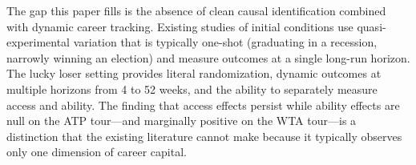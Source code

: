 The gap this paper fills is the absence of clean causal identification combined with dynamic career tracking. Existing studies of initial conditions use quasi-experimental variation that is typically one-shot (graduating in a recession, narrowly winning an election) and measure outcomes at a single long-run horizon. The lucky loser setting provides literal randomization, dynamic outcomes at multiple horizons from 4 to 52 weeks, and the ability to separately measure access and ability. The finding that access effects persist while ability effects are null on the ATP tour---and marginally positive on the WTA tour---is a distinction that the existing literature cannot make because it typically observes only one dimension of career capital.
